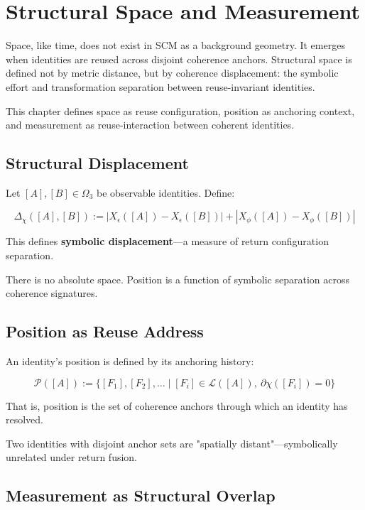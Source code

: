 \chapter{Structural Space and Measurement} \label{chapter-structural-space}

Space, like time, does not exist in SCM as a background geometry. It emerges when identities are reused across disjoint coherence anchors. Structural space is defined not by metric distance, but by coherence displacement: the symbolic effort and transformation separation between reuse-invariant identities.

This chapter defines space as reuse configuration, position as anchoring context, and measurement as reuse-interaction between coherent identities.

\section{Structural Displacement} \label{sec:displacement}

Let $[A], [B] \in \Omega_3$ be observable identities. Define:

\[
\Delta_\chi([A], [B]) := \left| X_\epsilon([A]) - X_\epsilon([B]) \right| + \left| X_\phi([A]) - X_\phi([B]) \right|
\]

This defines \textbf{symbolic displacement}—a measure of return configuration separation.

There is no absolute space. Position is a function of symbolic separation across coherence signatures.

\section{Position as Reuse Address} \label{sec:position}

An identity's position is defined by its anchoring history:

\begin{equation}
\mathcal{P}([A]) := \{ [F_1], [F_2], \dots \mid [F_i] \in \mathcal{L}([A]),\ \partial\chi([F_i]) = 0 \}
\end{equation}

That is, position is the set of coherence anchors through which an identity has resolved.

Two identities with disjoint anchor sets are "spatially distant"—symbolically unrelated under return fusion.

\section{Measurement as Structural Overlap} \label{sec:measurement}

